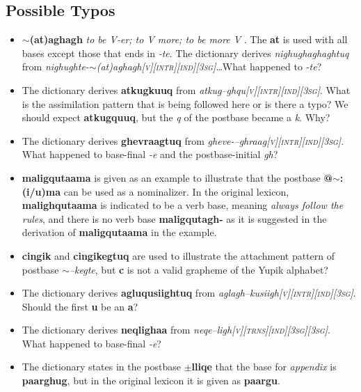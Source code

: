 \documentclass{article}
\begin{document}
\subsection{Possible Typos}

\begin{itemize}
\item \textbf{$\sim$(at)aghagh} \textit{to be V-er; to V more; to be more V} . The \textbf{at} is used with all bases except those that ends in \textit{-te}. The dictionary derives \textit{nighughaghaghtuq} from \textit{nighughte-$\sim$(at)aghagh\textsc{[v][intr][ind][3sg]}}\ldots What happened to \textit{-te}?

\item The dictionary derives \textbf{atkugkuuq} from \textit{atkug--ghqu\textsc{[v][intr][ind][3sg]}}. What is the assimilation pattern that is being followed here or is there a typo? We should expect \textbf{atkugquuq}, but the \textit{q} of the postbase became a \textit{k}. Why?

\item The dictionary derives \textbf{ghevraagtuq} from \textit{gheve-–ghraag\textsc{[v][intr][ind][3sg]}}. What happened to base-final \textit{-e} and the postbase-initial \textit{gh}?

\item \textbf{maligqutaama} is given as an example to illustrate that the postbase \textbf{@$\sim$:(i/u)ma} can be used as a nominalizer. In the original lexicon, \textbf{malighqutaama} is indicated to be a verb base, meaning \textit{always follow the rules}, and there is no verb base \textbf{maligqutagh-} as it is suggested in the derivation of \textbf{maligqutaama} in the example.

\item \textbf{cingik} and \textbf{cingikegtuq} are used to illustrate the attachment pattern of postbase \textit{$\sim$--kegte}, but \textbf{c} is not a valid grapheme of the Yupik alphabet?

\item The dictionary derives \textbf{agluqusiightuq} from \textit{aglagh--kusiigh\textsc{[v][intr][ind][3sg]}}. Should the first \textbf{u} be an \textbf{a}?

\item The dictionary derives \textbf{neqlighaa} from \textit{neqe--ligh\textsc{[v][trns][ind][3sg][3sg]}}. What happened to base-final \textit{-e}?

\item The dictionary states in the postbase \textbf{$\pm$lliqe} that the base for \textit{appendix} is \textbf{paarghug}, but in the  original lexicon it is given as \textbf{paargu}.


\end{itemize}
\end{document}
